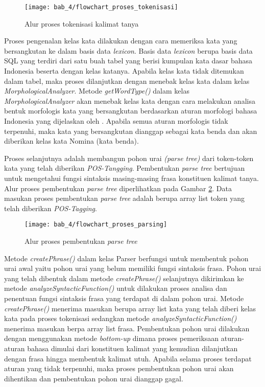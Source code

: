 \begin{figure}[ht]
    \centering
    \texttt{[image: bab\_4/flowchart\_proses\_tokenisasi]}
    \caption{Alur proses tokenisasi kalimat tanya}
    \label{fig:flowchart_proses_tokenisasi}
\end{figure}

Proses pengenalan kelas kata dilakukan dengan cara memeriksa kata yang bersangkutan ke dalam basis data \emph{lexicon}. Basis data \emph{lexicon} berupa basis data SQL yang terdiri dari satu buah tabel yang berisi kumpulan kata dasar bahasa Indonesia beserta dengan kelas katanya. Apabila kelas kata tidak ditemukan dalam tabel, maka proses dilanjutkan dengan menebak kelas kata dalam kelas \emph{MorphologicalAnalyzer}. Metode \emph{getWordType()} dalam kelas \emph{MorphologicalAnalyzer} akan menebak kelas kata dengan cara melakukan analisa bentuk morfologis kata yang bersangkutan berdasarkan aturan morfologi bahasa Indonesia yang dijelaskan oleh \citet{alwi}. Apabila semua aturan morfologis tidak terpenuhi, maka kata yang bersangkutan dianggap sebagai kata benda dan akan diberikan kelas kata Nomina (kata benda).

Proses selanjutnya adalah membangun pohon urai \emph{(parse tree)} dari token-token kata yang telah diberikan \emph{POS-Tangging}. Pembentukan \emph{parse tree} bertujuan untuk mengetahui fungsi sintaksis masing-masing frasa konstituen kalimat tanya. Alur proses pembentukan \emph{parse tree} diperlihatkan pada Gambar \ref{fig:flowchart_proses_parsing}. Data masukan proses pembentukan \emph{parse tree} adalah berupa array list token yang telah diberikan \emph{POS-Tagging}.

\begin{figure}[!ht]
    \centering
    \texttt{[image: bab\_4/flowchart\_proses\_parsing]}
    \caption{Alur proses pembentukan \emph{parse tree}}
    \label{fig:flowchart_proses_parsing}
\end{figure}

Metode \emph{createPhrase()} dalam kelas Parser berfungsi untuk membentuk pohon urai awal yaitu pohon urai yang belum memiliki fungsi sintaksis frasa. Pohon urai yang telah dibentuk dalam metode \emph{createPhrase()} selanjutnya dikirimkan ke metode \emph{analyzeSyntacticFunction()} untuk dilakukan proses analisa dan penentuan fungsi sintaksis frasa yang terdapat di dalam pohon urai. Metode \emph{createPhrase()} menerima masukan berupa array list kata yang telah diberi kelas kata pada proses tokenisasi sedangkan metode \emph{analyzeSyntacticFunction()} menerima masukan berpa array list frasa. Pembentukan pohon urai dilakukan dengan menggunakan metode \emph{bottom-up} dimana proses pemeriksaan aturan-aturan bahasa dimulai dari konstituen kalimat yang kemudian dilanjutkan dengan frasa hingga membentuk kalimat utuh. Apabila selama proses terdapat aturan yang tidak terpenuhi, maka proses pembentukan pohon urai akan dihentikan dan pembentukan pohon urai dianggap gagal.

